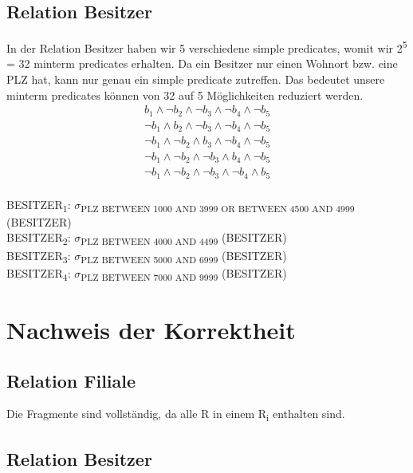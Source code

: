 \documentclass[11pt,a4paper,parskip=half]{scrartcl}
\begin{document}
\subsection{Relation Besitzer}
In der Relation Besitzer haben wir 5 verschiedene simple predicates, womit wir 2\textsuperscript{5} = 32 minterm predicates erhalten. Da ein Besitzer nur einen Wohnort bzw. eine PLZ hat, kann nur genau ein simple predicate zutreffen. Das bedeutet unsere minterm predicates können von 32 auf 5 Möglichkeiten reduziert werden.
\begin{align*}
b_1 \wedge \neg b_2 \wedge \neg b_3 \wedge \neg b_4 \wedge \neg b_5\\
\neg b_1 \wedge  b_2 \wedge \neg b_3 \wedge \neg b_4 \wedge \neg b_5\\
\neg b_1 \wedge \neg b_2 \wedge  b_3 \wedge \neg b_4 \wedge \neg b_5\\
\neg b_1 \wedge \neg  b_2 \wedge \neg b_3 \wedge  b_4 \wedge \neg b_5\\
\neg b_1 \wedge \neg b_2 \wedge \neg b_3 \wedge \neg b_4 \wedge b_5\\
\end{align*}


BESITZER\textsubscript{1}: $\sigma$\textsubscript{PLZ  BETWEEN 1000 AND 3999 OR BETWEEN 4500 AND 4999} (BESITZER)\\
BESITZER\textsubscript{2}: $\sigma$\textsubscript{PLZ  BETWEEN 4000 AND 4499} (BESITZER)\\
BESITZER\textsubscript{3}: $\sigma$\textsubscript{PLZ  BETWEEN 5000 AND 6999} (BESITZER)\\
BESITZER\textsubscript{4}: $\sigma$\textsubscript{PLZ  BETWEEN 7000 AND 9999} (BESITZER)\\


\section{Nachweis der Korrektheit}
\subsection{Relation Filiale}
Die Fragmente sind vollständig, da alle R in einem R\textsubscript{i} enthalten sind.

\subsection{Relation Besitzer}
\end{document}
